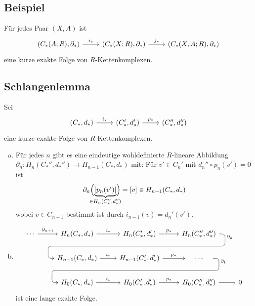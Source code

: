 \subsection[Beispiel einer kurzen exakten Folge von Kettenkomplexen]{Beispiel} %
\label{sub:811}
Für jedes Paar $(X,A)$ ist 
\[
	\begin{tikzcd}
		\enbrace*{C_*(A;R),\partial_*} \rar["i_*"] & \enbrace*{C_*(X;R),\partial_*} \rar["j_*"] & \enbrace*{C_*(X,A;R),\partial_*}   
	\end{tikzcd}
\]
eine kurze exakte Folge von $R$-Kettenkomplexen.

\subsection{Schlangenlemma} %
\label{sub:812}
Sei 
\[
	\begin{tikzcd}
		(C_*,d_*) \rar["i_*"] & (C_*',d_*') \rar["p_*"] & (C_*'',d_*'')
	\end{tikzcd}
\]
eine kurze exakte Folge von $R$-Kettenkomplexen.
\begin{enumerate}[a)]
	\item Für jedes $n$ gibt es eine eindeutige wohldefinierte $R$-lineare Abbildung $\partial_n \colon H_n(C_*'',d_*'') \to H_{n-1}(C_*,d_*)$ mit:
	Für $v' \in C_n'$ mit $d_n'' \circ p_n(v')=0$ ist 
	\[
		\partial_n \enbrace[\Big]{\underbrace{\benbrace*{p_n(v')}}_{\mathclap{\in H_n(C_*'',d_*'')}} } = [v] \in H_{n-1}(C_*,d_*)
	\]
	wobei $v \in C_{n-1}$ bestimmt ist durch $i_{n-1}(v)= d_n'(v')$.
	\item 
	\[
		\begin{tikzcd}
			\cdots \rar["\partial_{n+1}"] & H_n(C_*,d_*) \rar["i_*"] & 
				H_n(C_*',d_*') \arrow[d, phantom, ""{coordinate, name=Z}] \rar["p_*"] 
					& H_n(C_*'',d_*'') \arrow[dll, "\partial_n" very near start, rounded corners, to path={
																	-- ([xshift=2ex]\tikztostart.east)
																	|- (Z) [near end]\tikztonodes
																	-| ([xshift=-2ex]\tikztotarget.west)
																	-- (\tikztotarget)
																	}] & \\
			& H_{n-1}(C_*,d_*) \rar["i_*"] 
				& H_{n-1}(C_*',d_*') \rar["p_*"] \arrow[d, phantom, ""{coordinate, name=R}]
					& \quad \cdots  \quad \arrow[dll, "\partial_1" very near start, rounded corners, to path={
																	-- ([xshift=2ex]\tikztostart.east)
																	|- (R) [near end]\tikztonodes
																	-| ([xshift=-2ex]\tikztotarget.west)
																	-- (\tikztotarget)
																	}]& \\
			& H_0(C_*,d_*) \rar["i_*"] & H_0(C_*',d_*') \rar["p_*"] & H_0(C_*'',d_*'') \rar & 0
		\end{tikzcd}
	\]
	ist eine lange exakte Folge.
\end{enumerate}
